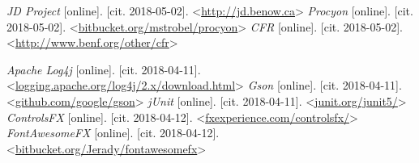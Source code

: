 \begin{thebibliography}{99}
 {\it JD Project} [online]. [cit. 2018-05-02]. \textless\url{http://jd.benow.ca}\textgreater
{} {\it Procyon} [online]. [cit. 2018-05-02]. \textless\url{bitbucket.org/mstrobel/procyon}\textgreater
{} {\it CFR} [online]. [cit. 2018-05-02]. \textless\url{http://www.benf.org/other/cfr}\textgreater

 {\it Apache Log4j} [online]. [cit. 2018-04-11]. \textless\url{logging.apache.org/log4j/2.x/download.html}\textgreater
{} {\it Gson} [online]. [cit. 2018-04-11]. \textless\url{github.com/google/gson}\textgreater
{} {\it jUnit} [online]. [cit. 2018-04-11]. \textless\url{junit.org/junit5/}\textgreater
{} {\it ControlsFX} [online]. [cit. 2018-04-12]. \textless\url{fxexperience.com/controlsfx/}\textgreater
{} {\it FontAwesomeFX} [online]. [cit. 2018-04-12]. \textless\url{bitbucket.org/Jerady/fontawesomefx}\textgreater




\end{thebibliography}
